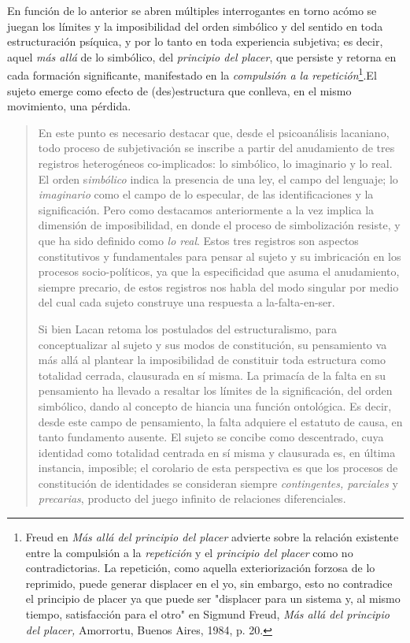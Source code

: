 \documentclass{book}
\begin{document}
En función de lo anterior se abren múltiples interrogantes en torno
acómo se juegan los límites y la imposibilidad del orden simbólico y del
sentido en toda estructuración psíquica, y por lo tanto en toda
experiencia subjetiva; es decir, aquel \emph{más allá} de lo simbólico,
del \emph{principio del placer}, que persiste y retorna en cada
formación significante, manifestado en la \emph{compulsión a la
repetición}\footnote{Freud en \emph{Más allá del principio del placer}
  advierte sobre la relación existente entre la compulsión a la
  \emph{repetición} y el \emph{principio del placer} como no
  contradictorias. La repetición, como aquella exteriorización forzosa
  de lo reprimido, puede generar displacer en el yo, sin embargo, esto
  no contradice el principio de placer ya que puede ser "displacer para
  un sistema y, al mismo tiempo, satisfacción para el otro" en Sigmund
  Freud, \emph{Más allá del principio del placer,} Amorrortu, Buenos
  Aires, 1984, p. 20.}.El sujeto emerge como efecto de (des)estructura
que conlleva, en el mismo movimiento, una pérdida.

\begin{quote}
En este punto es necesario destacar que, desde el psicoanálisis
lacaniano, todo proceso de subjetivación se inscribe a partir del
anudamiento de tres registros heterogéneos co-implicados: lo simbólico,
lo imaginario y lo real. El orden s\emph{imbólico} indica la presencia
de una ley, el campo del lenguaje; lo \emph{imaginario} como el campo de
lo especular, de las identificaciones y la significación. Pero como
destacamos anteriormente a la vez implica la dimensión de imposibilidad,
en donde el proceso de simbolización resiste, y que ha sido definido
como \emph{lo real}. Estos tres registros son aspectos constitutivos y
fundamentales para pensar al sujeto y su imbricación en los procesos
socio-políticos, ya que la especificidad que asuma el anudamiento,
siempre precario, de estos registros nos habla del modo singular por
medio del cual cada sujeto construye una respuesta a la-falta-en-ser.

Si bien Lacan retoma los postulados del estructuralismo, para
conceptualizar al sujeto y sus modos de constitución, su pensamiento va
más allá al plantear la imposibilidad de constituir toda estructura como
totalidad cerrada, clausurada en sí misma. La primacía de la falta en su
pensamiento ha llevado a resaltar los límites de la significación, del
orden simbólico, dando al concepto de hiancia una función ontológica. Es
decir, desde este campo de pensamiento, la falta adquiere el estatuto de
causa, en tanto fundamento ausente. El sujeto se concibe como
descentrado, cuya identidad como totalidad centrada en sí misma y
clausurada es, en última instancia, imposible; el corolario de esta
perspectiva es que los procesos de constitución de identidades se
consideran siempre \emph{contingentes, parciales} y \emph{precarias},
producto del juego infinito de relaciones diferenciales.
\end{quote}
\end{document}
